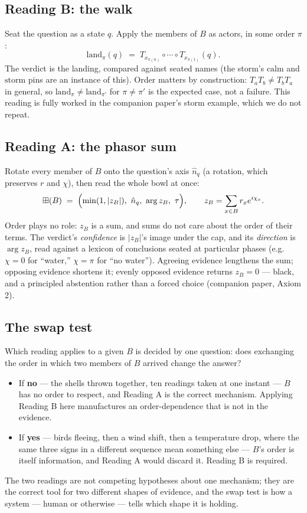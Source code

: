 \documentclass[12pt, a4paper]{article}
\begin{document}
\subsection{Reading B: the walk}
\label{subsec:reading_b}
Seat the question as a state $q$. Apply the members of $B$ as actors,
in some order $\pi$:
\[
    \mathrm{land}_\pi(q) \;=\; T_{x_{\pi(n)}}\circ\cdots\circ
    T_{x_{\pi(1)}}(q).
\]
The verdict is the landing, compared against seated names (the storm's
$\mathrm{calm}$ and $\mathrm{storm}$ pins are an instance of this).
Order matters by construction: $T_a T_b\neq T_b T_a$ in general, so
$\mathrm{land}_\pi \neq \mathrm{land}_{\pi'}$ for $\pi\neq\pi'$ is the
expected case, not a failure. This reading is fully worked in the
companion paper's storm example, which we do not repeat.

\subsection{Reading A: the phasor sum}
\label{subsec:reading_a}
Rotate every member of $B$ onto the question's axis $\hat n_q$ (a
rotation, which preserves $r$ and $\chi$), then read the whole bowl at
once:
\[
    \boxplus(B) \;=\; \Bigl(\min(1,|z_B|),\ \hat n_q,\ \arg z_B,\ \tau\Bigr),
    \qquad
    z_B=\sum_{x\in B} r_x e^{i\chi_x}.
\]
Order plays no role: $z_B$ is a sum, and sums do not care about the
order of their terms. The verdict's \emph{confidence} is $|z_B|$'s
image under the cap, and its \emph{direction} is $\arg z_B$, read
against a lexicon of conclusions seated at particular phases (e.g.\
$\chi=0$ for ``water,'' $\chi=\pi$ for ``no water''). Agreeing evidence
lengthens the sum; opposing evidence shortens it; evenly opposed
evidence returns $z_B=0$ --- black, and a principled abstention rather
than a forced choice (companion paper, Axiom 2).

\subsection{The swap test}
\label{subsec:swap_test}
Which reading applies to a given $B$ is decided by one question: does
exchanging the order in which two members of $B$ arrived change the
answer?
\begin{itemize}
\item If \textbf{no} --- the shells thrown together, ten readings
      taken at one instant --- $B$ has no order to respect, and
      Reading A is the correct mechanism. Applying Reading B here
      manufactures an order-dependence that is not in the evidence.
\item If \textbf{yes} --- birds fleeing, then a wind shift, then a
      temperature drop, where the same three signs in a different
      sequence mean something else --- $B$'s order is itself
      information, and Reading A would discard it. Reading B is
      required.
\end{itemize}
The two readings are not competing hypotheses about one mechanism;
they are the correct tool for two different shapes of evidence, and
the swap test is how a system --- human or otherwise --- tells which
shape it is holding.
\end{document}
